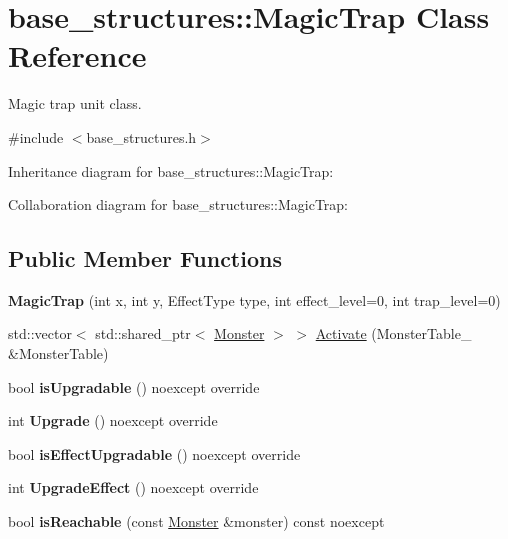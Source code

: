 \hypertarget{classbase__structures_1_1MagicTrap}{}\section{base\+\_\+structures\+:\+:Magic\+Trap Class Reference}
\label{classbase__structures_1_1MagicTrap}


Magic trap unit class.  




{\ttfamily \#include $<$base\+\_\+structures.\+h$>$}



Inheritance diagram for base\+\_\+structures\+:\+:Magic\+Trap\+:


Collaboration diagram for base\+\_\+structures\+:\+:Magic\+Trap\+:
\subsection*{Public Member Functions}
\begin{DoxyCompactItemize}
\item 
\mbox{\label{classbase__structures_1_1MagicTrap_abb2624055f03e2fa5ac15c43f7251c65}} 
{\bfseries Magic\+Trap} (int x, int y, Effect\+Type type, int effect\+\_\+level=0, int trap\+\_\+level=0)
\item 
std\+::vector$<$ std\+::shared\+\_\+ptr$<$ \hyperlink{classbase__structures_1_1Monster}{Monster} $>$ $>$ \hyperlink{classbase__structures_1_1MagicTrap_abf07990e9b4de0990474820f083b5f8f}{Activate} (Monster\+Table\+\_\+ \&Monster\+Table)
\item 
\mbox{\label{classbase__structures_1_1MagicTrap_a12db2c4ec072db951183f8440b909058}} 
bool {\bfseries is\+Upgradable} () noexcept override
\item 
\mbox{\label{classbase__structures_1_1MagicTrap_a2de5ede4969585c62b786844b7d2ad3c}} 
int {\bfseries Upgrade} () noexcept override
\item 
\mbox{\label{classbase__structures_1_1MagicTrap_abe4207699f32108af9fcca2ab13eac0c}} 
bool {\bfseries is\+Effect\+Upgradable} () noexcept override
\item 
\mbox{\label{classbase__structures_1_1MagicTrap_a5faff4b2e0f8907038eb7bd7ab7f3a19}} 
int {\bfseries Upgrade\+Effect} () noexcept override
\item 
\mbox{\label{classbase__structures_1_1MagicTrap_a42d1cc879b1b98e18872b3ec4ed6df14}} 
bool {\bfseries is\+Reachable} (const \hyperlink{classbase__structures_1_1Monster}{Monster} \&monster) const noexcept
\end{DoxyCompactItemize}
